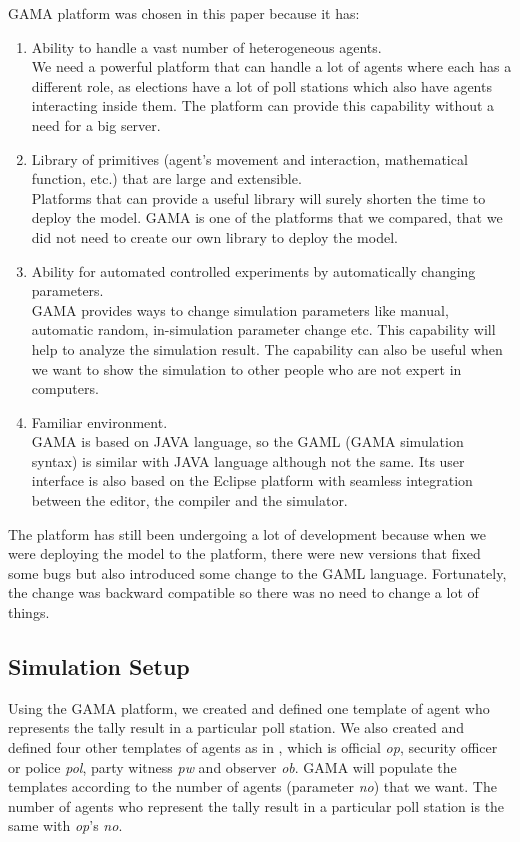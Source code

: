 \documentclass[JIP]{ipsj}
\begin{document}
GAMA platform was chosen in this paper because it has:
\begin{enumerate}%
\item Ability to handle a vast number of heterogeneous agents.\\
We need a powerful platform that can handle a lot of agents where each has a different role, as elections have a lot of poll stations which also have agents interacting inside them. The platform can provide this capability without a need for a big server.

\item Library of primitives (agent's movement and interaction, mathematical function, etc.) that are large and extensible.\\
Platforms that can provide a useful library will surely shorten the time to deploy the model. GAMA is one of the platforms that we compared, that we did not need to create our own library to deploy the model.

\item Ability for automated controlled experiments by automatically changing parameters.\\
GAMA provides ways to change simulation parameters like manual, automatic random, in-simulation parameter change etc. This capability will help to analyze the simulation result. The capability can also be useful when we want to show the simulation to other people who are not expert in computers.

\item Familiar environment.\\
GAMA is based on JAVA language, so the GAML (GAMA simulation syntax) is similar with JAVA language although not the same. Its user interface is also based on the Eclipse platform with seamless integration between the editor, the compiler and the simulator.
\end{enumerate}%

The platform has still been undergoing a lot of development because when we were deploying the model to the platform, there were new versions that fixed some bugs but also introduced some change to the GAML language. Fortunately, the change was backward compatible so there was no need to change a lot of things.


\subsection{Simulation Setup}%

Using the GAMA platform, we created and defined one template of agent who represents the tally result in a particular poll station. We also created and defined four other templates of agents as in , which is official \textit{op}, security officer or police \textit{pol}, party witness \textit{pw} and observer \textit{ob}. GAMA will populate the templates according to the number of agents (parameter \textit{no}) that we want. The number of agents who represent the tally result in a particular poll station is the same with \textit{op}’s \textit{no}.
\end{document}

